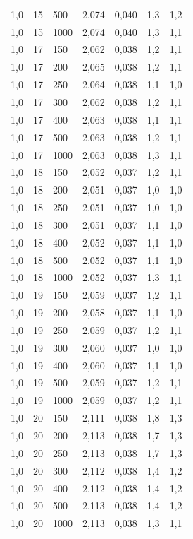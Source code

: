 \begin{tabular}{lllllll}
        1,0 & 15 & 500 & 2,074 & 0,040 & 1,3 & 1,2 \\ 
        1,0 & 15 & 1000 & 2,074 & 0,040 & 1,3 & 1,1 \\ 
        1,0 & 17 & 150 & 2,062 & 0,038 & 1,2 & 1,1 \\ 
        1,0 & 17 & 200 & 2,065 & 0,038 & 1,2 & 1,1 \\ 
        1,0 & 17 & 250 & 2,064 & 0,038 & 1,1 & 1,0 \\ 
        1,0 & 17 & 300 & 2,062 & 0,038 & 1,2 & 1,1 \\ 
        1,0 & 17 & 400 & 2,063 & 0,038 & 1,1 & 1,1 \\ 
        1,0 & 17 & 500 & 2,063 & 0,038 & 1,2 & 1,1 \\ 
        1,0 & 17 & 1000 & 2,063 & 0,038 & 1,3 & 1,1 \\ 
        1,0 & 18 & 150 & 2,052 & 0,037 & 1,2 & 1,1 \\ 
        1,0 & 18 & 200 & 2,051 & 0,037 & 1,0 & 1,0 \\ 
        1,0 & 18 & 250 & 2,051 & 0,037 & 1,0 & 1,0 \\ 
        1,0 & 18 & 300 & 2,051 & 0,037 & 1,1 & 1,0 \\ 
        1,0 & 18 & 400 & 2,052 & 0,037 & 1,1 & 1,0 \\ 
        1,0 & 18 & 500 & 2,052 & 0,037 & 1,1 & 1,0 \\ 
        1,0 & 18 & 1000 & 2,052 & 0,037 & 1,3 & 1,1 \\ 
        1,0 & 19 & 150 & 2,059 & 0,037 & 1,2 & 1,1 \\ 
        1,0 & 19 & 200 & 2,058 & 0,037 & 1,1 & 1,0 \\ 
        1,0 & 19 & 250 & 2,059 & 0,037 & 1,2 & 1,1 \\ 
        1,0 & 19 & 300 & 2,060 & 0,037 & 1,0 & 1,0 \\ 
        1,0 & 19 & 400 & 2,060 & 0,037 & 1,1 & 1,0 \\ 
        1,0 & 19 & 500 & 2,059 & 0,037 & 1,2 & 1,1 \\ 
        1,0 & 19 & 1000 & 2,059 & 0,037 & 1,2 & 1,1 \\ 
        1,0 & 20 & 150 & 2,111 & 0,038 & 1,8 & 1,3 \\ 
        1,0 & 20 & 200 & 2,113 & 0,038 & 1,7 & 1,3 \\ 
        1,0 & 20 & 250 & 2,113 & 0,038 & 1,7 & 1,3 \\ 
        1,0 & 20 & 300 & 2,112 & 0,038 & 1,4 & 1,2 \\ 
        1,0 & 20 & 400 & 2,112 & 0,038 & 1,4 & 1,2 \\ 
        1,0 & 20 & 500 & 2,113 & 0,038 & 1,4 & 1,2 \\ 
        1,0 & 20 & 1000 & 2,113 & 0,038 & 1,3 & 1,1 \\ \hline
    \end{tabular}

